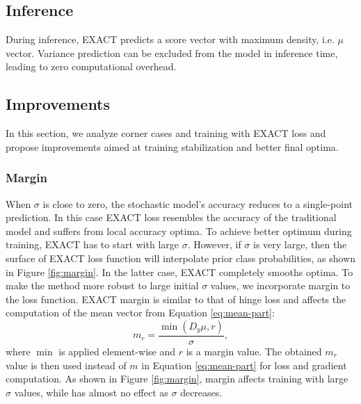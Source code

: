 \documentclass[nohyperref]{article}
\theoremstyle{plain}
\theoremstyle{definition}
\theoremstyle{remark}
\begin{document}
\subsection{Inference}


During inference, EXACT predicts a score vector with maximum density, i.e. $\mu$ vector. Variance prediction can be excluded from the model in inference time, leading to zero computational overhead.

\subsection{Improvements}
In this section, we analyze corner cases and training with \mbox{EXACT} loss and propose improvements aimed at training stabilization and better final optima.

\subsubsection{Margin}
When $\sigma$ is close to zero, the stochastic model's accuracy reduces to a single-point prediction. In this case \mbox{EXACT} loss resembles the accuracy of the traditional model and suffers from local accuracy optima. To achieve better optimum during training, EXACT has to start with large $\sigma$. However, if $\sigma$ is very large, then the surface of EXACT loss function will interpolate prior class probabilities, as shown in Figure \ref{fig:margin}. In the latter case, EXACT completely smooths optima. To make the method more robust to large initial $\sigma$ values, we incorporate margin to the loss function.
EXACT margin is similar to that of hinge loss and affects the computation of the mean vector from Equation \ref{eq:mean-part}:
\begin{equation}
    m_r = \frac{\min\left(D_y\mu, r\right)}{\sigma},
\end{equation}
where $\min$ is applied element-wise and $r$ is a margin value. The obtained $m_r$ value is then used instead of $m$ in Equation \ref{eq:mean-part} for loss and gradient computation. As shown in Figure \ref{fig:margin}, margin affects training with large $\sigma$ values, while has almost no effect as $\sigma$ decreases.
\end{document}
